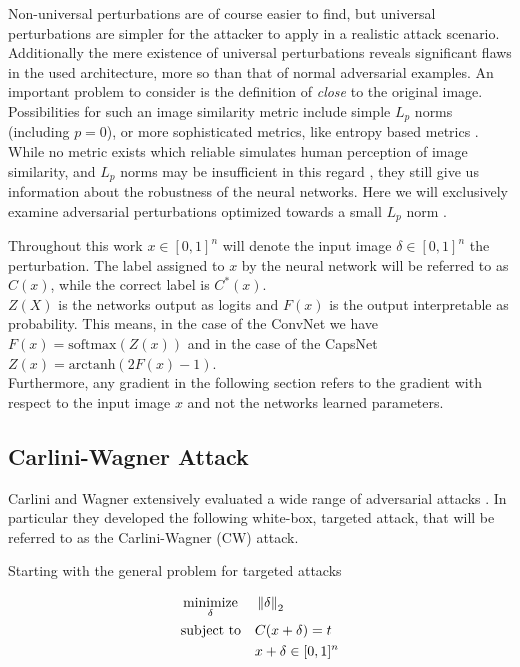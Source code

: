 Non-universal perturbations are of course easier to find, but universal perturbations are simpler for the attacker to apply in a realistic attack scenario. Additionally the mere existence of universal perturbations reveals significant flaws in the used architecture, more so than that of normal adversarial examples. 
An important problem to consider is the definition of \emph{close} to the original image. Possibilities for such an image similarity metric include simple $L_p$ norms (including $p=0$),
or more sophisticated metrics, like entropy based metrics .
While no metric exists which reliable simulates human perception of image similarity, and $L_p$ norms may be insufficient in this regard \cite{lpnorms}, they still give us information about the robustness of the neural networks. Here we will exclusively examine adversarial perturbations optimized towards a small $L_p$ norm .

Throughout this work $x \in [0,1]^n$ will denote the input image $\delta \in [0,1]^n$ the perturbation.
The label assigned to $x$ by the neural network will be referred to as $C(x)$, while the correct label is $C^*(x)$.\\
$Z(X)$ is the networks output as logits and $F(x)$ is the output interpretable as probability.
This means, in the case of the ConvNet we have $F(x) = \mathrm{softmax}(Z(x))$ and in the case of the CapsNet $Z(x) = \mathrm{arctanh}(2F(x) - 1)$. \\
Furthermore, any gradient in the following section refers to the gradient with respect to the input image $x$ and not the networks learned parameters.



\subsection{Carlini-Wagner Attack}

Carlini and Wagner extensively evaluated a wide range of adversarial attacks \cite{carlini}.
In particular they developed the following white-box, targeted attack, that will be referred to as the Carlini-Wagner (CW) attack.

Starting with the general problem for targeted attacks

\begin{equation}
\begin{aligned}
& \operatorname*{minimize}_{\delta} && \left \lVert \delta \right \rVert _2 \\
& \text{subject to} && C(x + \delta) = t \\
& && x + \delta \in [0,1]^n
\end{aligned}
\end{equation}


